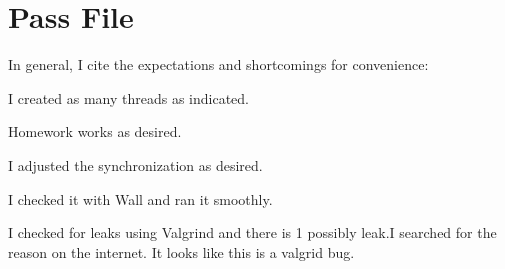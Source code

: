 \documentclass{article}
\begin{document}
\section{Pass File}

In general, I cite the expectations and shortcomings for convenience:

I created as many threads as indicated.

Homework works as desired.

I adjusted the synchronization as desired.

I checked it with Wall and ran it smoothly.

I checked for leaks using Valgrind and there is 1 possibly leak.I searched for the reason on the internet. It looks like this is a valgrid bug.
\end{document}
